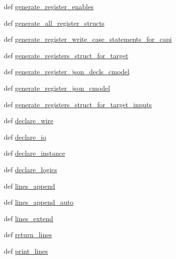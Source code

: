 \begin{DoxyCompactItemize}
\item 
def \hyperlink{namespaceverilog__generator_a960e77cce25482f5e9d572f8b69aced1}{generate\-\_\-register\-\_\-enables}
\item 
def \hyperlink{namespaceverilog__generator_a81ad5b6204f02b19a37e605f22e82e82}{generate\-\_\-all\-\_\-register\-\_\-structs}
\item 
def \hyperlink{namespaceverilog__generator_a8001fdf85cc4eff67474e3b9e5934a8b}{generate\-\_\-register\-\_\-write\-\_\-case\-\_\-statements\-\_\-for\-\_\-capi}
\item 
def \hyperlink{namespaceverilog__generator_a3f2f3a22d4048b756f3973cdf6879d1b}{generate\-\_\-registers\-\_\-struct\-\_\-for\-\_\-target}
\item 
def \hyperlink{namespaceverilog__generator_a6c52443a57fbea26ffbbe647107e9bcf}{generate\-\_\-register\-\_\-json\-\_\-decls\-\_\-cmodel}
\item 
def \hyperlink{namespaceverilog__generator_ab3cfd64ea4cc95b1fc5c502887d1dac3}{generate\-\_\-register\-\_\-json\-\_\-cmodel}
\item 
def \hyperlink{namespaceverilog__generator_aeaa45a75a6321f4cfa7ae96947d89ce8}{generate\-\_\-registers\-\_\-struct\-\_\-for\-\_\-target\-\_\-inputs}
\item 
def \hyperlink{namespaceverilog__generator_a6563d671701159de89515ae3c7e42e76}{declare\-\_\-wire}
\item 
def \hyperlink{namespaceverilog__generator_a3d47b1b0da6e4fb31235f0abcc33e2b3}{declare\-\_\-io}
\item 
def \hyperlink{namespaceverilog__generator_ae15e6e2383bf95293904d980b3f797fb}{declare\-\_\-instance}
\item 
def \hyperlink{namespaceverilog__generator_afab72caaa1ef66f1902240b27f35b4ad}{declare\-\_\-logics}
\item 
def \hyperlink{namespaceverilog__generator_a42a2da088265b5bb4f9745b0128f7f7c}{lines\-\_\-append}
\item 
def \hyperlink{namespaceverilog__generator_a34f3e378bd6814ba4629fd379af67993}{lines\-\_\-append\-\_\-auto}
\item 
def \hyperlink{namespaceverilog__generator_aef71dfd8e3ef95955c441db6a541135b}{lines\-\_\-extend}
\item 
def \hyperlink{namespaceverilog__generator_a592da8cd2096daeb8b42aead926ead8e}{return\-\_\-lines}
\item 
def \hyperlink{namespaceverilog__generator_af91af3939549a5c93eff3b53f1be6a89}{print\-\_\-lines}
\item 

\end{DoxyCompactItemize}
